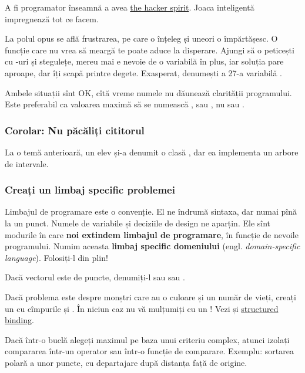 \documentclass[../main.tex]{subfiles}
\begin{document}
A fi programator înseamnă a avea \href{https://en.wikipedia.org/wiki/Hacker_culture}{the hacker spirit}. Joaca inteligentă impregnează tot ce facem.

La polul opus se află frustrarea, pe care o înțeleg și uneori o împărtășesc. O funcție care nu vrea să meargă te poate aduce la disperare. Ajungi să o peticești cu -uri și stegulețe, mereu mai e nevoie de o variabilă în plus, iar soluția pare aproape, dar îți scapă printre degete. Exasperat, denumești a 27-a variabilă .

Ambele situații sînt OK, cîtă vreme numele nu dăunează clarității programului. Este preferabil ca valoarea maximă să se numească ,  sau , nu  sau .

\subsubsection*{Corolar: Nu păcăliți cititorul}

La o temă anterioară, un elev și-a denumit o clasă , dar ea implementa un arbore de intervale.

\subsubsection*{Creați un limbaj specific problemei}

Limbajul de programare este o convenție. El ne îndrumă sintaxa, dar numai pînă la un punct. Numele de variabile și deciziile de design ne aparțin. Ele sînt modurile în care \textbf{noi extindem limbajul de programare}, în funcție de nevoile programului. Numim aceasta \textbf{limbaj specific domeniului} (engl. \textit{domain-specific language}). Folosiți-l din plin!

Dacă vectorul este de puncte, denumiți-l  sau  sau .

Dacă problema este despre monștri care au o culoare și un număr de vieți, creați un  cu cîmpurile  și . În niciun caz nu vă mulțumiți cu un ! Vezi și \href{https://stackoverflow.com/questions/31792910/assigning-members-of-a-pair-to-variables}{structured binding}.

Dacă într-o buclă alegeți maximul pe baza unui criteriu complex, atunci izolați compararea într-un operator sau într-o funcție de comparare. Exemplu: sortarea polară a unor puncte, cu departajare după distanța față de origine.
\end{document}
